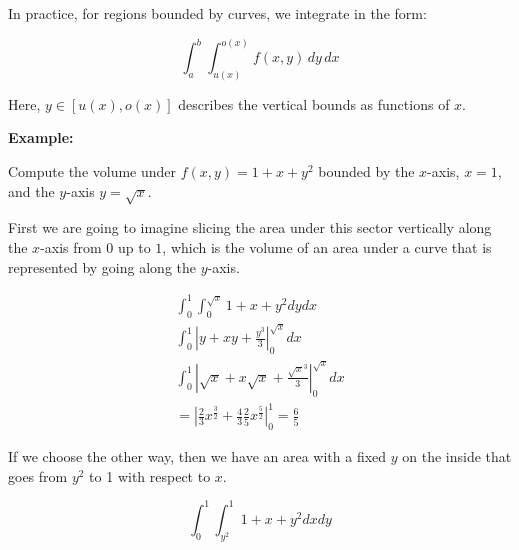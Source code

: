 In practice, for regions bounded by curves, we integrate in the form:

\[
    \int_a^b \int_{u(x)}^{o(x)} f(x, y)\, dy\, dx
\]

Here, \( y \in [u(x), o(x)] \) describes the vertical bounds as functions of \(x\).

\textbf{Example:}

Compute the volume under \(f(x,y) = 1 + x + y^2\) bounded by the \(x\)-axis, \(x = 1\), and the 
\(y\)-axis \(y = \sqrt{x}\).

\begin{center}
\end{center}

First we are going to imagine slicing the area under this sector vertically along the \(x\)-axis from 
\(0\) up to \(1\), which is the volume of an area under a curve that is represented by going along the 
\(y\)-axis.

\begin{align*}
    \int_{0}^{1}\int_{0}^{\sqrt{x}} 1 + x + y^2 dy dx \\
    \int_{0}^{1} \left| y + xy + \frac{y^3}{3} \right|_{0}^{\sqrt{x}} dx \\
    \int_{0}^{1} \left| \sqrt{x} + x\sqrt{x} + \frac{\sqrt{x}^3}{3} \right|_{0}^{\sqrt{x}} dx \\
    = \left| \frac{2}{3} x^{\frac{3}{2}} + \frac{4}{3} \frac{2}{5} x^{\frac{5}{2}} \right|_{0}^{1} = \frac{6}{5}
\end{align*}

If we choose the other way, then we have an area with a fixed \(y\) on the inside that goes from \(y^2\) to 
1 with respect to \(x\).

\[
    \int_{0}^{1}\int_{y^2}^{1} 1 + x + y^2 dx dy
\]

